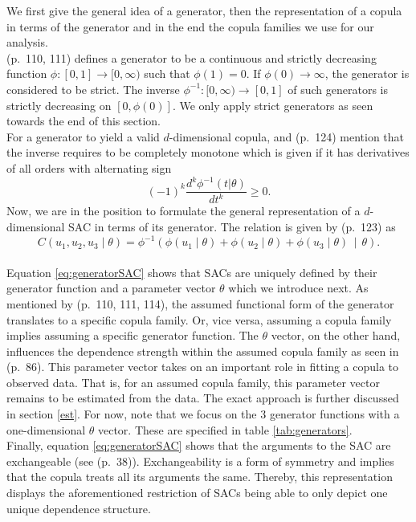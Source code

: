 \documentclass[
]{krantz}
\begin{document}
We first give the general idea of a generator, then the
representation of a copula in terms of the generator and in the end the
copula families we use for our analysis.\\
\citet{nelsen2006} (p.~110, 111) defines a generator to be a
continuous and strictly decreasing function
\(\phi: [0, 1] \to [0, \infty)\) such that \(\phi(1) = 0\).
If \(\phi(0) \to \infty\), the generator is considered to be strict.
The inverse \(\phi^{-1}:[0, \infty) \to [0, 1]\) of such generators is
strictly decreasing on \([0, \phi(0)]\).
We only apply strict generators as seen towards the end of this section.\\
For a generator to yield a valid \(d\)-dimensional copula,
\citet{grimaldi2006} and \citet{zhang2019} (p.~124) mention that the inverse
requires to be completely monotone which is given if it has
derivatives of all orders with alternating sign
\[
(-1)^k \frac{d^k \phi^{-1}(t|\theta)}{dt^k} \geq 0.
\label{eq:changingsign}
\]
Now, we are in the position to formulate the general representation of a
\(d\)-dimensional SAC in terms of its generator.
The relation is given by
\citet{zhang2019} (p.~123) as
\[
C(u_1, u_2, u_3 \mid \theta) = \phi^{-1} \left( \phi(u_1 \mid \theta) + \phi(u_2 \mid \theta) + \phi(u_3 \mid \theta) \,\middle|\, \theta \right).
\label{eq:generatorSAC}
\]\\
Equation \eqref{eq:generatorSAC} shows that
SACs are uniquely defined by their generator
function and a parameter vector \(\theta\) which we introduce next.
As mentioned by \citet{nelsen2006} (p.~110, 111, 114), the
assumed functional form of the generator translates to a specific copula
family. Or, vice versa, assuming a copula family implies assuming a specific generator function.
The \(\theta\) vector, on the other hand,
influences the dependence strength within the assumed copula family
as seen in \citet{zhang2019} (p.~86).
This parameter vector takes on an important role in fitting a copula to observed data.
That is, for an assumed copula family, this parameter vector remains to be estimated from the data.
The exact approach is further discussed in section \ref{est}.
For now, note that we focus on the \(3\) generator functions with a one-dimensional \(\theta\) vector.
These are specified in table \ref{tab:generators}.\\
Finally, equation \eqref{eq:generatorSAC} shows that the arguments
to the SAC are exchangeable (see \citet{nelsen2006} (p.~38)).
Exchangeability is a form of symmetry and implies that the copula treats
all its arguments the same.
Thereby, this representation displays the aforementioned restriction of SACs being able to only depict one unique dependence structure.
\end{document}
